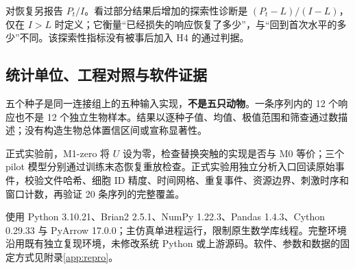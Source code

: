 对恢复另报告 $P_t/I$。看过部分结果后增加的探索性诊断是 $(P_t-L)/(I-L)$，仅在 $I>L$ 时定义；它衡量“已经损失的响应恢复了多少”，与“回到首次水平的多少”不同。该探索性指标没有被事后加入 H4 的通过判据。

\subsection{统计单位、工程对照与软件证据}
五个种子是同一连接组上的五种输入实现，\textbf{不是五只动物}。一条序列内的 12 个响应也不是 12 个独立生物样本。结果以逐种子值、均值、极值范围和筛查通过数描述；没有构造生物总体置信区间或宣称显著性。

正式实验前，M1-zero 将 $U$ 设为零，检查替换突触的实现是否与 M0 等价；三个 pilot 模型分别通过训练末态恢复重放检查。正式实验用独立分析入口回读原始事件，校验文件哈希、细胞 ID 精度、时间网格、重复事件、资源边界、刺激时序和窗口计数，再验证 20 条序列的完整覆盖。

使用 Python 3.10.21、Brian2 2.5.1、NumPy 1.22.3、Pandas 1.4.3、Cython 0.29.33 与 PyArrow 17.0.0；主仿真单进程运行，限制原生数学库线程。完整环境沿用既有独立复现环境，未修改系统 Python 或上游源码。软件、参数和数据的固定方式见附录\ref{app:repro}。
\FloatBarrier
